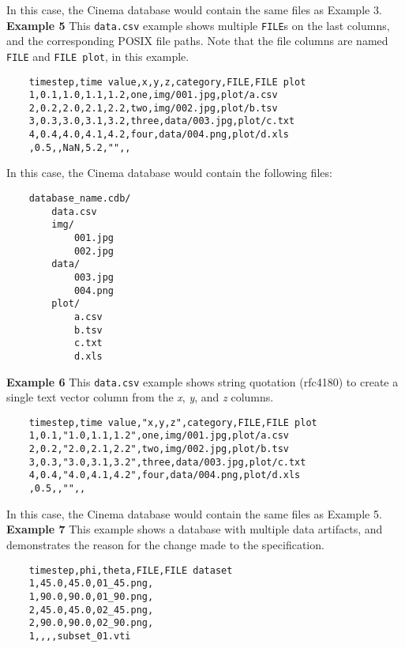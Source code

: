 \noindent
In this case, the Cinema database would contain the same files as 
Example 3. \\

\noindent
\textbf{Example 5} This \texttt{\small data.csv} example shows multiple
\texttt{\small FILE}s on the last columns, and the corresponding POSIX file 
paths. Note that the file columns are named \texttt{\small FILE}
and \texttt{\small FILE plot}, in this example.

\begin{verbatim}
    timestep,time value,x,y,z,category,FILE,FILE plot
    1,0.1,1.0,1.1,1.2,one,img/001.jpg,plot/a.csv
    2,0.2,2.0,2.1,2.2,two,img/002.jpg,plot/b.tsv
    3,0.3,3.0,3.1,3.2,three,data/003.jpg,plot/c.txt
    4,0.4,4.0,4.1,4.2,four,data/004.png,plot/d.xls
    ,0.5,,NaN,5.2,"",,
\end{verbatim}

\noindent
In this case, the Cinema database would contain the following files:

\begin{verbatim}
    database_name.cdb/
        data.csv
        img/
            001.jpg
            002.jpg
        data/
            003.jpg
            004.png
        plot/
            a.csv
            b.tsv
            c.txt
            d.xls
\end{verbatim}

\noindent
\textbf{Example 6} This \texttt{\small data.csv} example shows string
quotation (rfc4180) to create a single text vector column from the
{\em x}, {\em y}, and {\em z} columns.

\begin{verbatim}
    timestep,time value,"x,y,z",category,FILE,FILE plot
    1,0.1,"1.0,1.1,1.2",one,img/001.jpg,plot/a.csv
    2,0.2,"2.0,2.1,2.2",two,img/002.jpg,plot/b.tsv
    3,0.3,"3.0,3.1,3.2",three,data/003.jpg,plot/c.txt
    4,0.4,"4.0,4.1,4.2",four,data/004.png,plot/d.xls
    ,0.5,,"",,
\end{verbatim}

\noindent
In this case, the Cinema database would contain the same files as Example 5. \\

\noindent
\textbf{Example 7} This example shows a database with multiple data artifacts,
and demonstrates the reason for the change made to the specification. 

\begin{verbatim}
    timestep,phi,theta,FILE,FILE dataset
    1,45.0,45.0,01_45.png,
    1,90.0,90.0,01_90.png,
    2,45.0,45.0,02_45.png,
    2,90.0,90.0,02_90.png,
    1,,,,subset_01.vti
\end{verbatim}

